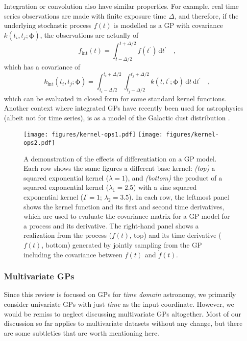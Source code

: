 \documentclass[letterpaper]{ar-1col}
\newcommand{\hyperparams}{\ensuremath{\boldsymbol{\phi}}}
\newcommand{\lengthscale}{\ensuremath{\lambda}}
\begin{document}
Integration or convolution also have similar properties.
For example, real time series observations are made with finite exposure time $\Delta$, and therefore, if the underlying stochastic process $f(t)$ is modelled as a GP with covariance $k(t_i,t_j;\hyperparams)$, the observations are actually of
\begin{equation}
  f_\mathrm{int}(t) = \int_{t-\Delta/2}^{t+\Delta/2} f(t^\prime)\,\mathrm{d}t^\prime \quad,
\end{equation}
which has a covariance of
\begin{equation}
  k_\mathrm{int}(t_i,t_j;\hyperparams) = \int_{t_i-\Delta/2}^{t_i+\Delta/2}\int_{t_j-\Delta/2}^{t_j+\Delta/2} k(t,t^\prime;\hyperparams)\,\mathrm{d}t\,\mathrm{d}t^\prime \quad,
\end{equation}
which can be evaluated in closed form for some standard kernel functions.
Another context where integrated GPs have recently been used for astrophysics (albeit not for time series), is as a model of the Galactic dust distribution \citep{2022arXiv220206797M}.

\begin{figure}[ht]
  \centering
  \texttt{[image: figures/kernel-ops1.pdf]}
  \texttt{[image: figures/kernel-ops2.pdf]}
  \caption{A demonstration of the effects of differentiation on a GP model.
  Each row shows the same figures a different base kernel: \emph{(top)} a squared exponential kernel ($\lengthscale = 1$), and \emph{(bottom)} the product of a squared exponential kernel ($\lengthscale_1 = 2.5$) with a sine squared exponential kernel ($\Gamma = 1$; $\lengthscale_2 = 3.5$).
  In each row, the leftmost panel shows the kernel function and its first and second time derivatives, which are used to evaluate the covariance matrix for a GP model for a process and its derivative.
  The right-hand panel shows a realization from the process ($f(t)$, top) and its time derivative ($\dot{f}(t)$, bottom) generated by jointly sampling from the GP including the covariance between $f(t)$ and $\dot{f}(t)$.}
  \label{fig:kernel-ops}
\end{figure}


\subsubsection{Multivariate GPs}

Since this review is focused on GPs for \emph{time domain} astronomy, we primarily consider univariate GPs with just \emph{time} as the input coordinate.
However, we would be remiss to neglect discussing multivariate GPs altogether.
Most of our discussion so far applies to multivariate datasets without any change, but there are some subtleties that are worth mentioning here.
\end{document}
